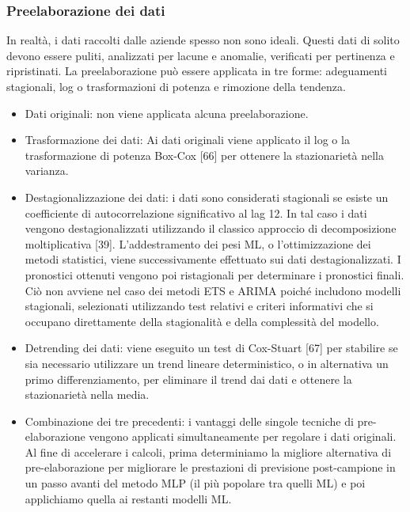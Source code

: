 \documentclass[12pt,a4paper]{report}
\begin{document}
\subsubsection{Preelaborazione dei dati}
In realtà, i dati raccolti dalle aziende spesso non sono ideali. Questi dati di solito devono essere puliti, analizzati per lacune e anomalie, verificati per pertinenza e ripristinati.
La preelaborazione può essere applicata in tre forme: adeguamenti stagionali, log o trasformazioni di potenza e rimozione della tendenza.
\begin{itemize}
\item Dati originali: non viene applicata alcuna preelaborazione.
\item Trasformazione dei dati: Ai dati originali viene applicato il log o la trasformazione di potenza Box-Cox [66] per ottenere la stazionarietà nella varianza.
\item Destagionalizzazione dei dati: i dati sono considerati stagionali se esiste un coefficiente di autocorrelazione significativo al lag 12. In tal caso i dati vengono destagionalizzati utilizzando il classico approccio di decomposizione moltiplicativa [39]. L'addestramento dei pesi ML, o l'ottimizzazione dei metodi statistici, viene successivamente effettuato sui dati destagionalizzati. I pronostici ottenuti vengono poi ristagionali per determinare i pronostici finali. Ciò non avviene nel caso dei metodi ETS e ARIMA poiché includono modelli stagionali, selezionati utilizzando test relativi e criteri informativi che si occupano direttamente della stagionalità e della complessità del modello.
\item Detrending dei dati: viene eseguito un test di Cox-Stuart [67] per stabilire se sia necessario utilizzare un trend lineare deterministico, o in alternativa un primo differenziamento, per eliminare il trend dai dati e ottenere la stazionarietà nella media.
\item Combinazione dei tre precedenti: i vantaggi delle singole tecniche di pre-elaborazione vengono applicati simultaneamente per regolare i dati originali. Al fine di accelerare i calcoli, prima determiniamo la migliore alternativa di pre-elaborazione per migliorare le prestazioni di previsione post-campione in un passo avanti del metodo MLP (il più popolare tra quelli ML) e poi applichiamo quella ai restanti modelli ML.
\end{itemize}
\end{document}
